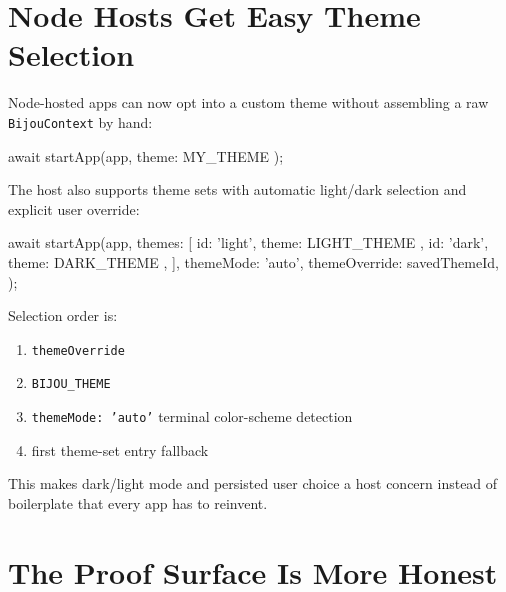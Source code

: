 \section{Node Hosts Get Easy Theme Selection}\label{record-280-node-hosts-get-easy-theme-selection}

Node-hosted apps can now opt into a custom theme without assembling a raw \texttt{B\allowbreak{}i\allowbreak{}j\allowbreak{}o\allowbreak{}u\allowbreak{}C\allowbreak{}o\allowbreak{}n\allowbreak{}t\allowbreak{}e\allowbreak{}x\allowbreak{}t} by hand:

\begin{CodeBlock}
await startApp(app, { theme: MY_THEME });
\end{CodeBlock}

The host also supports theme sets with automatic light/dark selection and explicit user override:

\begin{CodeBlock}
await startApp(app, {
  themes: [
    { id: 'light', theme: LIGHT_THEME },
    { id: 'dark', theme: DARK_THEME },
  ],
  themeMode: 'auto',
  themeOverride: savedThemeId,
});
\end{CodeBlock}

Selection order is:

\begin{enumerate}
\def\labelenumi{\arabic{enumi}.}
\tightlist
\item
  \texttt{t\allowbreak{}h\allowbreak{}e\allowbreak{}m\allowbreak{}e\allowbreak{}O\allowbreak{}v\allowbreak{}e\allowbreak{}r\allowbreak{}r\allowbreak{}i\allowbreak{}d\allowbreak{}e}
\item
  \texttt{B\allowbreak{}I\allowbreak{}J\allowbreak{}O\allowbreak{}U\allowbreak{}\_\allowbreak{}T\allowbreak{}H\allowbreak{}E\allowbreak{}M\allowbreak{}E}
\item
  \texttt{t\allowbreak{}h\allowbreak{}e\allowbreak{}m\allowbreak{}e\allowbreak{}M\allowbreak{}o\allowbreak{}d\allowbreak{}e\allowbreak{}:\allowbreak{} \allowbreak{}'\allowbreak{}a\allowbreak{}u\allowbreak{}t\allowbreak{}o\allowbreak{}'} terminal color-scheme detection
\item
  first theme-set entry fallback
\end{enumerate}

This makes dark/light mode and persisted user choice a host concern instead of boilerplate that every app has to reinvent.

\section{The Proof Surface Is More Honest}\label{record-280-the-proof-surface-is-more-honest}

